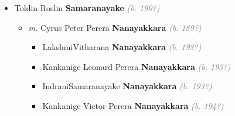\documentclass[10pt, openany]{book}
\begin{document}
\begin{itemize}
{\begin{itemize}
{\begin{itemize}
{\begin{itemize}
{\begin{itemize}
{\begin{itemize}
{ }
\item{Malini \textbf{Kotalawala} \textcolor{gray}{\textit{(b. 193?)}}
 }
\item{SitaJayawardena \textbf{Kotalawala} \textcolor{gray}{\textit{(b. 193?)}}
 }
\item{Douglas \textbf{Kotalawala} \textcolor{gray}{\textit{(b. 193?)}}
 }
\item{Dickson \textbf{Kotalawala} \textcolor{gray}{\textit{(b. 194?)}}
 }
\item{George \textbf{Kotalawala} \textcolor{gray}{\textit{(b. 194?)}}
\begin{itemize}
\item{\textit{m.} Pearl \textbf{Unknown} \textcolor{slorange}{\textit{}}   \label{couple:00000482:00000898} \begin{itemize}
\item{Indrakanthi \textbf{Kotalawala} \textcolor{slorange}{\textit{}}
 }
\item{Mahasen \textbf{Kotalawala} \textcolor{slorange}{\textit{}}
 }
\end{itemize}}
\end{itemize}
 }
\end{itemize}}
\end{itemize}
   }
\item{Toldin Roslin \textbf{Samaranayake} \textcolor{gray}{\textit{(b. 190?)}}
\begin{itemize}
\item{\textit{m.} Cyrus Peter Perera \textbf{Nanayakkara} \textcolor{gray}{\textit{(b. 189?)}}   \label{couple:00000565:00000690} \begin{itemize}
\item{LakshmiVitharana \textbf{Nanayakkara} \textcolor{gray}{\textit{(b. 193?)}}
 }
\item{Kankanige Leonard Perera \textbf{Nanayakkara} \textcolor{gray}{\textit{(b. 193?)}}
   }
\item{IndraniSamaranayake \textbf{Nanayakkara} \textcolor{gray}{\textit{(b. 193?)}}
 }
\item{Kankanige Victor Perera \textbf{Nanayakkara} \textcolor{gray}{\textit{(b. 194?)}}
}
\end{itemize}}
\end{itemize}}
\end{itemize}}
\end{itemize}}
\end{itemize}}
\end{itemize}
\end{document}
